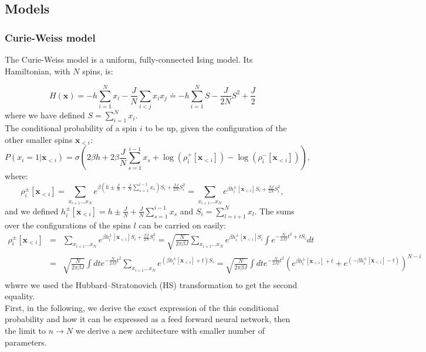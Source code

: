 \documentclass[aps,physrev,10pt,floatfix,longbibliography,nofootinbib,reprint]{revtex4-2}
\begin{document}
\subsection{Models}
\subsubsection{Curie-Weiss model}

The Curie-Weiss model is a uniform, fully-connected Ising model. Its Hamiltonian, with $N$ spins, is:

\begin{equation}
H\left(\mathbf{x}\right)=-h\sum_{i=1}^{N}x_{i}-\frac{J}{N}\sum_{i<j}x_{i}x_{j}
\doteq -h\sum_{i=1}^{N} S - \frac{J}{2N}S^2 + \frac{J}{2}
\end{equation}
 where we have defined $S=\sum_{i=1}^{N}x_{i}$.\\
 The conditional probability of a spin $i$ to be up, given the configuration of the other smaller spins $\mathbf{x}_{<i}$:
\begin{equation}
P\left(x_{i}=1|\mathbf{x}_{<i}\right) = \sigma\left( 
 2 \beta h + 2 \beta \frac{J}{N}\sum_{s=1}^{i-1}x_s +\log(\rho_i^+[\mathbf{x}_{<i}]) - \log(\rho_i^-[\mathbf{x}_{<i}])
\right),
\end{equation}
where:
\begin{equation*}
\rho_i^{\pm}[\mathbf{x}_{<i}] = \sum_{x_{i+1}\dots 
x_{N}}e^{\beta \left(h\pm\frac{J}{N}+\frac{J}{N}\sum_{s=1}^{i-1}x_{s}\right)S_{i}+\frac{\beta J}{2N}S_{i}^{2}} = 
\sum_{x_{i+1}\dots x_{N}} e^{\beta h_i^{\pm}[\mathbf{x}_{<i}]S_i +\frac{\beta J}{2N}S_{i}^{2}},
\end{equation*}
and we defined $h_i^{\pm}[\mathbf{x}_{<i}] = h\pm\frac{J}{N}+\frac{J}{N}\sum_{s=1}^{i-1}x_{s}$ and $S_i=\sum_{l=i+1}^{N}x_{l}$. The sums over the configurations of the spins $l$ can be carried on easily:
\begin{eqnarray*}
 \rho_i^{\pm}[\mathbf{x}_{<i}] & = & \sum_{x_{i+1}\dots x_{N}} e^{\beta h_i^{\pm}[\mathbf{x}_{<i}]S_i +\frac{\beta J}{2N}S_{i}^{2}}
  = \sqrt{\frac{N}{2\pi \beta J}}\sum_{x_{i+1}\dots x_{N}}e^{\beta h_i^{\pm}[\mathbf{x}_{<i}] S_{i}}\int e^{-\frac{N}{2J \beta}t^{2}+t S_{i}} dt\\
 & = & \sqrt{\frac{N}{2\pi \beta J}}\int dt e^{-\frac{N}{2J \beta}t^{2}} \sum_{x_{i+1}\dots x_{N}}e^{(\beta h_i^{\pm}[\mathbf{x}_{<i}] + t) S_{i}}  
 =  \sqrt{\frac{N}{2\pi \beta J}}\int dt e^{-\frac{N}{2J \beta}t^{2}} \left(e^{\beta h_i^{\pm}[\mathbf{x}_{<i}] + t} + e^{ (-\beta h_i^{\pm}[\mathbf{x}_{<i}] - t)} \right)^{N-i}  \\ 
 \label{eq:rho_last_exact}
 \end{eqnarray*} 
 whwre we used the Hubbard–Stratonovich (HS) transformation to get the second equality.\\
 First, in the following,  we derive the exact expression of the this conditional probability and how it can be expressed as a feed forward neural network, then the limit to $n\rightarrow N$ we derive a new architecture with smaller number of parameters.\\
\end{document}
